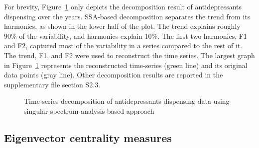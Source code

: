 \documentclass[
  authoryear,
  review]{elsarticle}
\begin{document}
For brevity, Figure~\ref{fig-ssa} only depicts the decomposition result
of antidepressants dispensing over the years. SSA-based decomposition
separates the trend from its harmonics, as shown in the lower half of
the plot. The trend explains roughly 90\% of the variability, and
harmonics explain 10\%. The first two harmonics, F1 and F2, captured
most of the variability in a series compared to the rest of it. The
trend, F1, and F2 were used to reconstruct the time series. The largest
graph in Figure~\ref{fig-ssa} represents the reconstructed time-series
(green line) and its original data points (gray line). Other
decomposition results are reported in the supplementary file section
S2.3.

\begin{figure}[H]


\caption{\label{fig-ssa}Time-series decomposition of antidepressants
dispensing data using singular spectrum analysis-based approach}

\end{figure}%

\subsection{Eigenvector centrality
measures}\label{eigenvector-centrality-measures}
\end{document}
